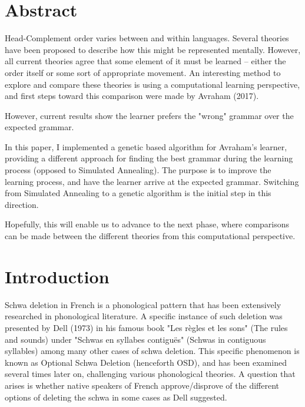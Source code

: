 \documentclass{article}
\begin{document}
\section*{Abstract}
{\sffamily\small

Head-Complement order varies between and within languages. Several theories have been proposed to describe how this might be represented mentally. However, all current theories agree that some element of it must be learned – either the order itself or some sort of appropriate movement.
An interesting method to explore and compare these theories is using a computational learning perspective, and first steps toward this comparison were made by Avraham (2017). 

However, current results show the learner prefers the "wrong" grammar over the expected grammar.

In this paper, I implemented a genetic based algorithm for Avraham's learner, providing a different approach for finding the best grammar during the learning process (opposed to Simulated Annealing).
The purpose is to improve the learning process, and have the learner arrive at the expected grammar.  Switching from Simulated Annealing to a genetic algorithm is the initial step in this direction.

Hopefully, this will enable us to advance to the next phase, where comparisons can be made between the different theories from this computational perspective.
}

\section{Introduction} 
Schwa deletion in French is a phonological pattern that has been extensively researched in phonological literature. A specific instance of such deletion was presented by Dell (1973) in his famous book "Les règles et les sons" (The rules and sounds) under "Schwas en syllabes contiguës" (Schwas in contiguous syllables) among many other cases of schwa deletion. This specific phenomenon is known as Optional Schwa Deletion (henceforth OSD), and has been examined several times later on,  challenging various phonological theories. A question that arises is whether native speakers of French approve/disprove of the different options of deleting the schwa in some cases as Dell suggested.\\
\end{document}
